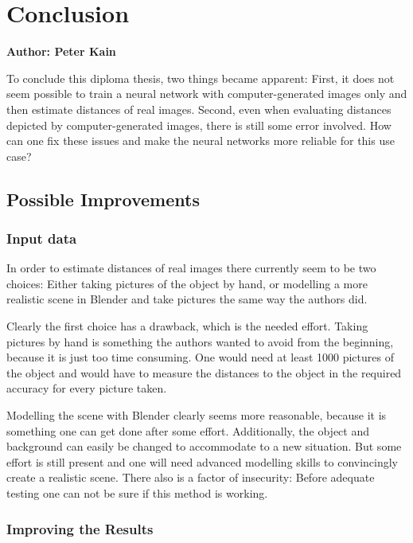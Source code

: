 \chapter{Conclusion}

\textbf{Author: Peter Kain} 

To conclude this diploma thesis, two things became apparent: First, it does not seem possible to train a neural network with computer-generated images only and then estimate distances of real images. Second, even when evaluating distances depicted by computer-generated images, there is still some error involved. How can one fix these issues and make the neural networks more reliable for this use case?

\section{Possible Improvements}

\subsection{Input data}

In order to estimate distances of real images there currently seem to be two choices: Either taking pictures of the object by hand, or modelling a more realistic scene in Blender and take pictures the same way the authors did.

Clearly the first choice has a drawback, which is the needed effort. Taking pictures by hand is something the authors wanted to avoid from the beginning, because it is just too time consuming. One would need at least 1000 pictures of the object and would have to measure the distances to the object in the required accuracy for every picture taken.

Modelling the scene with Blender clearly seems more reasonable, because it is something one can get done after some effort. Additionally, the object and background can easily be changed to accommodate to a new situation. But some effort is still present and one will need advanced modelling skills to convincingly create a realistic scene. There also is a factor of insecurity: Before adequate testing one can not be sure if this method is working.

\subsection{Improving the Results}

